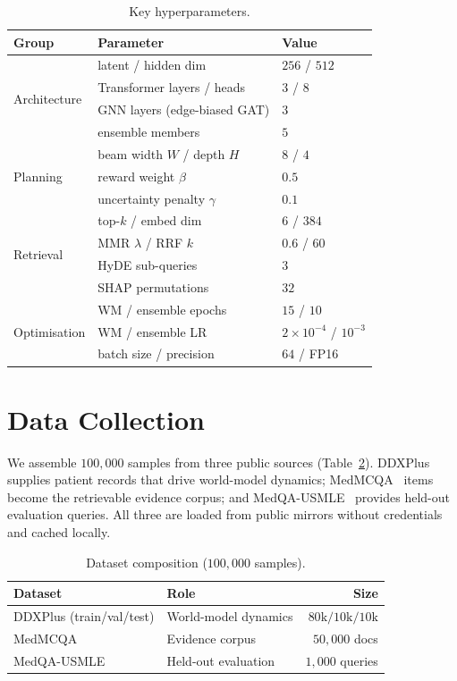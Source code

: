 \documentclass[11pt,a4paper]{report}
\begin{document}
\begin{table}[H]
\caption{Key hyperparameters.}
\label{tab:hyper}
\centering
\small
\begin{tabular}{lll}
\toprule
\textbf{Group} & \textbf{Parameter} & \textbf{Value}\\
\midrule
\multirow{4}{*}{Architecture}
  & latent / hidden dim         & $256$ / $512$ \\
  & Transformer layers / heads  & $3$ / $8$ \\
  & GNN layers (edge-biased GAT) & $3$ \\
  & ensemble members            & $5$ \\
\midrule
\multirow{3}{*}{Planning}
  & beam width $W$ / depth $H$   & $8$ / $4$ \\
  & reward weight $\beta$        & $0.5$ \\
  & uncertainty penalty $\gamma$ & $0.1$ \\
\midrule
\multirow{4}{*}{Retrieval}
  & top-$k$ / embed dim          & $6$ / $384$ \\
  & MMR $\lambda$ / RRF $k$       & $0.6$ / $60$ \\
  & HyDE sub-queries             & $3$ \\
  & SHAP permutations            & $32$ \\
\midrule
\multirow{3}{*}{Optimisation}
  & WM / ensemble epochs         & $15$ / $10$ \\
  & WM / ensemble LR             & $2\!\times\!10^{-4}$ / $10^{-3}$ \\
  & batch size / precision       & $64$ / FP16 \\
\bottomrule
\end{tabular}
\end{table}

\section{Data Collection}
We assemble $100{,}000$ samples from three public sources
(Table~\ref{tab:data}). DDXPlus~\cite{tchango2022ddxplus} supplies patient
records that drive world-model dynamics; MedMCQA~\cite{pal2022medmcqa} items
become the retrievable evidence corpus; and MedQA-USMLE~\cite{jin2021medqa}
provides held-out evaluation queries. All three are loaded from public mirrors
without credentials and cached locally.

\begin{table}[H]
\caption{Dataset composition ($100{,}000$ samples).}
\label{tab:data}
\centering
\small
\begin{tabular}{llr}
\toprule
\textbf{Dataset} & \textbf{Role} & \textbf{Size}\\
\midrule
DDXPlus (train/val/test) & World-model dynamics & $80\text{k}/10\text{k}/10\text{k}$\\
MedMCQA                  & Evidence corpus      & $50{,}000$ docs\\
MedQA-USMLE              & Held-out evaluation  & $1{,}000$ queries\\
\bottomrule
\end{tabular}
\end{table}
\end{document}
